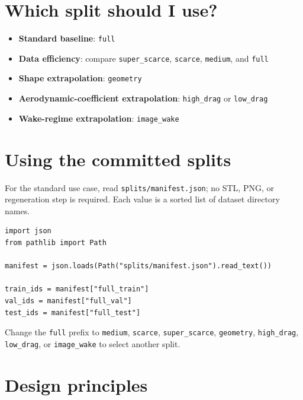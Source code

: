\documentclass[10pt]{article}
\newcommand{\code}[1]{\texttt{#1}}
\newcommand{\splitkey}[1]{\texttt{#1}}
\begin{document}
\section*{Which split should I use?}

\begin{itemize}
  \item \textbf{Standard baseline}: \splitkey{full}
  \item \textbf{Data efficiency}: compare \splitkey{super\_scarce}, \splitkey{scarce}, \splitkey{medium}, and \splitkey{full}
  \item \textbf{Shape extrapolation}: \splitkey{geometry}
  \item \textbf{Aerodynamic-coefficient extrapolation}: \splitkey{high\_drag} or \splitkey{low\_drag}
  \item \textbf{Wake-regime extrapolation}: \splitkey{image\_wake}
\end{itemize}

\section*{Using the committed splits}

For the standard use case, read \code{splits/manifest.json}; no STL, PNG, or
regeneration step is required. Each value is a sorted list of dataset directory
names.

\begin{verbatim}
import json
from pathlib import Path

manifest = json.loads(Path("splits/manifest.json").read_text())

train_ids = manifest["full_train"]
val_ids = manifest["full_val"]
test_ids = manifest["full_test"]
\end{verbatim}

Change the \code{full} prefix to \code{medium}, \code{scarce},
\code{super\_scarce}, \code{geometry}, \code{high\_drag}, \code{low\_drag}, or
\code{image\_wake} to select another split.

\section*{Design principles}
\end{document}
